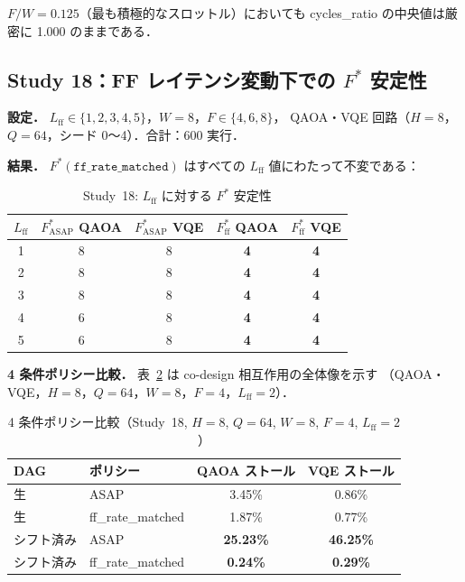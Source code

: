 \documentclass[journal,10pt,twocolumn]{IEEEtran}
\begin{document}
$F/W = 0.125$（最も積極的なスロットル）においても
cycles\_ratio の中央値は厳密に 1.000 のままである．

\subsection{Study 18：FF レイテンシ変動下での $F^*$ 安定性}

\textbf{設定．}
$L_{\mathrm{ff}} \in \{1, 2, 3, 4, 5\}$，$W=8$，$F \in \{4, 6, 8\}$，
QAOA・VQE 回路（$H=8$，$Q=64$，シード 0〜4）．合計：600 実行．

\textbf{結果．}
$F^*(\texttt{ff\_rate\_matched})$ はすべての $L_{\mathrm{ff}}$ 値にわたって不変である：

\begin{table}[h]
\centering
\caption{Study~18: $L_{\mathrm{ff}}$ に対する $F^*$ 安定性}
\label{tab:study18}
\begin{tabular}{ccccc}
\toprule
$L_{\mathrm{ff}}$ & $F^*_{\mathrm{ASAP}}$ QAOA & $F^*_{\mathrm{ASAP}}$ VQE
  & $F^*_{\mathrm{ff}}$ QAOA & $F^*_{\mathrm{ff}}$ VQE \\
\midrule
1 & 8 & 8 & \textbf{4} & \textbf{4} \\
2 & 8 & 8 & \textbf{4} & \textbf{4} \\
3 & 8 & 8 & \textbf{4} & \textbf{4} \\
4 & 6 & 8 & \textbf{4} & \textbf{4} \\
5 & 6 & 8 & \textbf{4} & \textbf{4} \\
\bottomrule
\end{tabular}
\end{table}

\textbf{4 条件ポリシー比較．}
表~\ref{tab:4way} は co-design 相互作用の全体像を示す
（QAOA・VQE，$H=8$，$Q=64$，$W=8$，$F=4$，$L_{\mathrm{ff}}=2$）．

\begin{table}[h]
\centering
\caption{4 条件ポリシー比較（Study~18, $H=8$, $Q=64$, $W=8$, $F=4$, $L_{\mathrm{ff}}=2$）}
\label{tab:4way}
\begin{tabular}{llcc}
\toprule
DAG & ポリシー & QAOA ストール & VQE ストール \\
\midrule
生 & ASAP & 3.45\% & 0.86\% \\
生 & ff\_rate\_matched & 1.87\% & 0.77\% \\
シフト済み & ASAP & \textbf{25.23\%} & \textbf{46.25\%} \\
シフト済み & ff\_rate\_matched & \textbf{0.24\%} & \textbf{0.29\%} \\
\bottomrule
\end{tabular}
\end{table}
\end{document}
